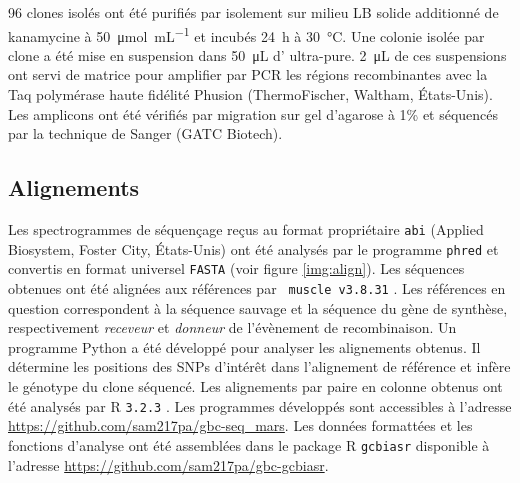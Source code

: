 96 clones isolés ont été purifiés par isolement sur milieu LB solide additionné
de kanamycine à \SI{50}{\umol\per\mL} et incubés \SI{24}{\hour} à
\SI{30}{\celsius}. Une colonie isolée par clone a été mise en suspension dans
\SI{50}{\uL} d' ultra-pure. \SI{2}{\uL} de ces suspensions ont servi de
matrice pour amplifier par PCR les régions recombinantes avec la Taq polymérase
haute fidélité Phusion (ThermoFischer, Waltham, États-Unis). Les amplicons ont
été vérifiés par migration sur gel d'agarose à 1\% et séquencés par la technique
de Sanger\cite{sanger_dna_1977} (GATC Biotech).


\newpage

\subsection{Alignements}
\label{subsec:align}

Les spectrogrammes de séquençage reçus au format propriétaire \texttt{abi}
(Applied Biosystem, Foster City, États-Unis) ont été analysés par le programme
\texttt{phred} \cite{ewing_base-calling_1998} et convertis en format universel
\texttt{FASTA} (voir figure \ref{img:align}). Les séquences obtenues ont été
alignées aux références par \texttt{ muscle v3.8.31} \cite{edgar_muscle:_2004}.
Les références en question correspondent à la séquence sauvage et la séquence du
gène de synthèse, respectivement \emph{receveur} et \emph{donneur} de
l'évènement de recombinaison. Un programme Python \cite{cock_biopython:_2009} a
été développé pour analyser les alignements obtenus. Il détermine les positions
des SNPs d'intérêt dans l'alignement de référence et infère le génotype du clone
séquencé. Les alignements par paire en colonne obtenus ont été analysés par
\textrm{R} \texttt{3.2.3} \cite{r_core_team_r:_2015}. Les programmes développés
sont accessibles à l'adresse \url{https://github.com/sam217pa/gbc-seq_mars}. Les
données formattées et les fonctions d'analyse ont été assemblées dans le package
\textrm{R} \texttt{gcbiasr} disponible à l'adresse
\url{https://github.com/sam217pa/gbc-gcbiasr}.
